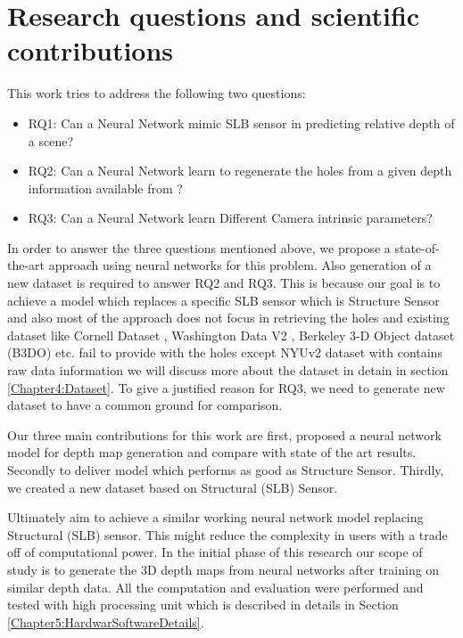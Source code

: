 \section{Research questions and scientific contributions}

This work tries to address the following two questions:
\begin{itemize}
    \item RQ1: Can a Neural Network mimic SLB sensor in predicting relative depth of a scene?
    \item RQ2: Can a Neural Network learn to regenerate the holes from a given depth information available from ?
    \item RQ3: Can a Neural Network learn Different Camera intrinsic parameters?  
\end{itemize}

In order to answer the three questions mentioned above, we propose a state-of-the-art approach using neural networks for this problem. Also generation of a new dataset is required to answer RQ2 and RQ3. This is because our goal is to achieve a model which replaces a specific SLB sensor which is Structure Sensor and also most of the approach does not focus in retrieving the holes and existing dataset like Cornell Dataset \cite{3Dscene} , Washington Data V2 \cite{Washington}, Berkeley 3-D Object dataset (B3DO) \cite{Janoch:EECS-2012-85} etc. fail to provide with the holes except NYUv2 dataset with contains raw data information we will discuss more about the dataset in detain in section \ref{Chapter4:Dataset}. To give a justified reason for RQ3, we need to generate new dataset to have a common ground for comparison. 

Our three main contributions for this work are first, proposed a neural network model for depth map generation and compare with state of the art results. Secondly to deliver model which performs as good as Structure Sensor. Thirdly,  we created a new dataset based on Structural (SLB) Sensor.

Ultimately aim to achieve a similar working neural network model replacing Structural (SLB) sensor. This might reduce the complexity in users with a trade off of computational power. In the initial phase of this research our scope of study is to generate the 3D depth maps from neural networks after training on similar depth data. All the computation and evaluation were performed and tested with high processing unit which is described in details in Section \ref{Chapter5:HardwarSoftwareDetails}.


